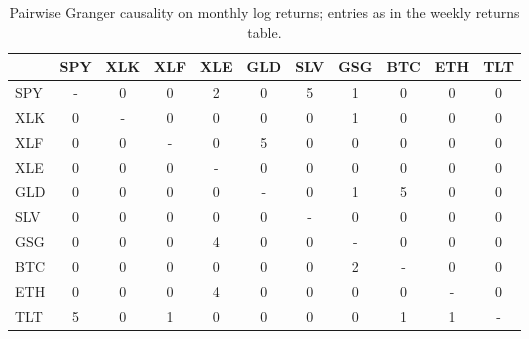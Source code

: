 \begin{table}[H]
\centering
\small
\begin{tabular}{lcccccccccc}
\toprule
 & SPY & XLK & XLF & XLE & GLD & SLV & GSG & BTC & ETH & TLT \\
\midrule
SPY & - & 0 & 0 & 2 & 0 & 5 & 1 & 0 & 0 & 0 \\
XLK & 0 & - & 0 & 0 & 0 & 0 & 1 & 0 & 0 & 0 \\
XLF & 0 & 0 & - & 0 & 5 & 0 & 0 & 0 & 0 & 0 \\
XLE & 0 & 0 & 0 & - & 0 & 0 & 0 & 0 & 0 & 0 \\
GLD & 0 & 0 & 0 & 0 & - & 0 & 1 & 5 & 0 & 0 \\
SLV & 0 & 0 & 0 & 0 & 0 & - & 0 & 0 & 0 & 0 \\
GSG & 0 & 0 & 0 & 4 & 0 & 0 & - & 0 & 0 & 0 \\
BTC & 0 & 0 & 0 & 0 & 0 & 0 & 2 & - & 0 & 0 \\
ETH & 0 & 0 & 0 & 4 & 0 & 0 & 0 & 0 & - & 0 \\
TLT & 5 & 0 & 1 & 0 & 0 & 0 & 0 & 1 & 1 & - \\
\bottomrule
\end{tabular}
\caption{Pairwise Granger causality on monthly log returns; entries as in the weekly returns table.}
\label{tab:returns_monthly}
\end{table}